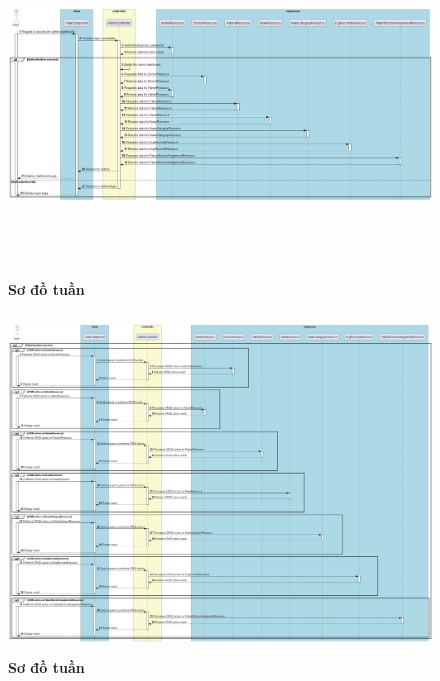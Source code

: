 \begin{figure}[H]
  \centering
  \includegraphics[width=16cm,height=9cm]{Images/server/sequence/web/seq_auth.png}
  \caption[Sơ đồ tuần tự ]{\bfseries \fontsize{12pt}{0pt}
  \selectfont Sơ đồ tuần }
  \label{hinh21} %
\end{figure}

\begin{figure}[H]
  \centering
  \includegraphics[width=16cm,height=9cm]{Images/server/sequence/web/seq_crud.png}
  \caption[Sơ đồ tuần tự ]{\bfseries \fontsize{12pt}{0pt}
  \selectfont Sơ đồ tuần }
  \label{hinh21} %
\end{figure}


\newpage